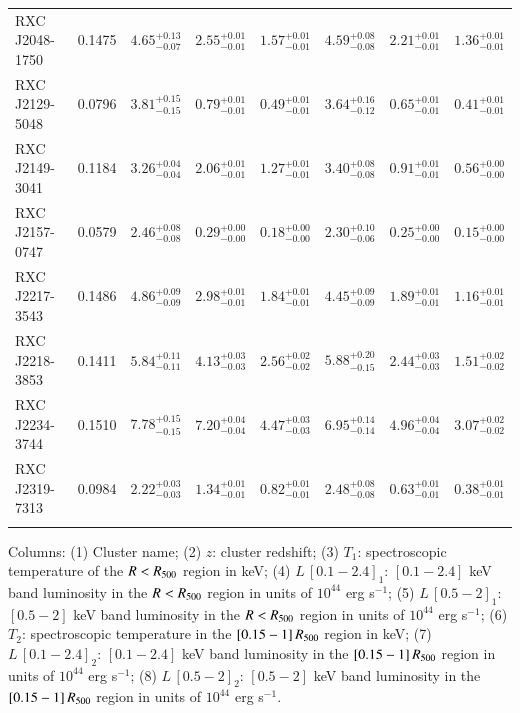 \documentclass[oldversion]{aa}
\begin{document}
\begin{table}
\begin{center}
\begin{tabular}{l l l r r l r r}
RXC\,J2048-1750 & 0.1475 & $4.65_{-0.07}^{+0.13}$ & $ 2.55_{-0.01}^{+0.01}$ & $ 1.57_{-0.01}^{+0.01}$ & $4.59_{-0.08}^{+0.08}$ & $ 2.21_{-0.01}^{+0.01}$ & $ 1.36_{-0.01}^{+0.01}$ \\
RXC\,J2129-5048 & 0.0796 & $3.81_{-0.15}^{+0.15}$ & $ 0.79_{-0.01}^{+0.01}$ & $ 0.49_{-0.01}^{+0.01}$ & $3.64_{-0.12}^{+0.16}$ & $ 0.65_{-0.01}^{+0.01}$ & $ 0.41_{-0.01}^{+0.01}$ \\
RXC\,J2149-3041 & 0.1184 & $3.26_{-0.04}^{+0.04}$ & $ 2.06_{-0.01}^{+0.01}$ & $ 1.27_{-0.01}^{+0.01}$ & $3.40_{-0.08}^{+0.08}$ & $ 0.91_{-0.01}^{+0.01}$ & $ 0.56_{-0.00}^{+0.00}$ \\
RXC\,J2157-0747 & 0.0579 & $2.46_{-0.08}^{+0.08}$ & $ 0.29_{-0.00}^{+0.00}$ & $ 0.18_{-0.00}^{+0.00}$ & $2.30_{-0.06}^{+0.10}$ & $ 0.25_{-0.00}^{+0.00}$ & $ 0.15_{-0.00}^{+0.00}$ \\
RXC\,J2217-3543 & 0.1486 & $4.86_{-0.09}^{+0.09}$ & $ 2.98_{-0.01}^{+0.01}$ & $ 1.84_{-0.01}^{+0.01}$ & $4.45_{-0.09}^{+0.09}$ & $ 1.89_{-0.01}^{+0.01}$ & $ 1.16_{-0.01}^{+0.01}$ \\
RXC\,J2218-3853 & 0.1411 & $5.84_{-0.11}^{+0.11}$ & $ 4.13_{-0.03}^{+0.03}$ & $ 2.56_{-0.02}^{+0.02}$ & $5.88_{-0.15}^{+0.20}$ & $ 2.44_{-0.03}^{+0.03}$ & $ 1.51_{-0.02}^{+0.02}$ \\
RXC\,J2234-3744 & 0.1510 & $7.78_{-0.15}^{+0.15}$ & $ 7.20_{-0.04}^{+0.04}$ & $ 4.47_{-0.03}^{+0.03}$ & $6.95_{-0.14}^{+0.14}$ & $ 4.96_{-0.04}^{+0.04}$ & $ 3.07_{-0.02}^{+0.02}$ \\
RXC\,J2319-7313 & 0.0984 & $2.22_{-0.03}^{+0.03}$ & $ 1.34_{-0.01}^{+0.01}$ & $ 0.82_{-0.01}^{+0.01}$ & $2.48_{-0.08}^{+0.08}$ & $ 0.63_{-0.01}^{+0.01}$ & $ 0.38_{-0.01}^{+0.01}$ \\
\\
\hline
\end{tabular}
\end{center}

Columns: (1) Cluster name; (2) $z$: cluster redshift; (3) $T_1$: spectroscopic  
temperature of the $R < R_{500}$ region in keV; (4) $L\,[0.1-2.4]_1$: $[0.1-2.4]$ keV band luminosity in the $R < R_{500}$ region in units of $10^{44}$ erg s$^{-1}$; (5) $L\,[0.5-2]_1$: $[0.5-2]$ keV band luminosity in the $R < R_{500}$ region in units of $10^{44}$ erg s$^{-1}$; (6) $T_2$: spectroscopic temperature in the $[0.15-1]\,R_{500}$ region in keV; (7) $L\,[0.1-2.4]_2$: $[0.1-2.4]$ keV band luminosity in the $[0.15-1]\, R_{500}$ region in units of $10^{44}$ erg s$^{-1}$; (8) $L\,[0.5-2]_2$: $[0.5-2]$ keV band luminosity in the $[0.15-1]\, R_{500}$ region in units of $10^{44}$ erg s$^{-1}$.
    \end{table}
\end{document}
